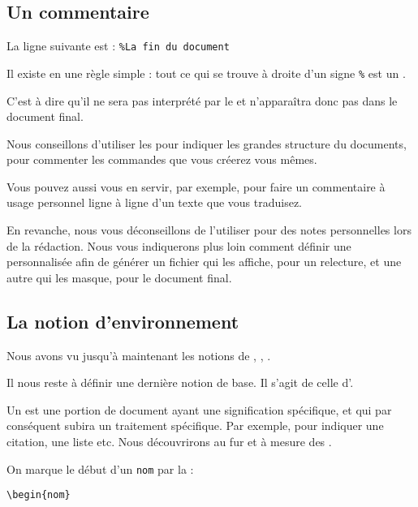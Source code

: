 \subsection{Un commentaire}

La ligne suivante est : \verb|%La fin du document|

Il existe en \logiciel{\LaTeX} une règle simple : tout ce qui se trouve à droite d'un signe \verb|%| est un .

C'est à dire qu'il ne sera pas interprété par le  et n'apparaîtra donc pas dans le document final. 

Nous conseillons d'utiliser les  pour indiquer les grandes structure du documents, pour commenter les commandes que vous créerez vous mêmes. 

Vous pouvez aussi vous en servir, par exemple, pour faire un commentaire à usage personnel ligne à ligne d'un texte que vous traduisez.

En revanche, nous vous déconseillons de l'utiliser pour des notes personnelles lors de la rédaction. Nous vous indiquerons plus loin  comment définir une  personnalisée afin de générer un fichier qui les affiche, pour un relecture, et une autre qui les masque, pour le document final.



\subsection{La notion d'environnement }

Nous avons vu jusqu'à maintenant les notions de  , , . 

Il nous reste à définir une dernière notion de base. Il s'agit de celle d'.

Un  est une portion de document ayant une signification spécifique, et qui par conséquent subira un traitement spécifique. Par exemple, pour indiquer une citation, une liste etc. Nous découvrirons au fur et à mesure  des . 


On marque le début d'un  \verb|nom| par la  :

\begin{verbatim}
\begin{nom}
\end{verbatim}

